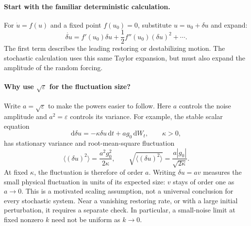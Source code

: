 \documentclass{article}
\begin{document}
\paragraph{Start with the familiar deterministic calculation.}
For $\dot u=f(u)$ and a fixed point $f(u_0)=0$, substitute $u=u_0+\delta u$ and expand:
\begin{equation}
    \dot{\delta u}=f'(u_0)\delta u+\frac12f''(u_0)(\delta u)^2+\cdots.
\end{equation}
The first term describes the leading restoring or destabilizing motion. The stochastic calculation uses this same Taylor expansion, but must also expand the amplitude of the random forcing.

\paragraph{Why use $\sqrt{\varepsilon}$ for the fluctuation size?}
Write $a=\sqrt{\varepsilon}$ to make the powers easier to follow. Here $a$ controls the noise amplitude and $a^2=\varepsilon$ controls its variance. For example, the stable scalar equation
\begin{equation}
    \mathrm d\delta u=-\kappa\delta u\,\mathrm dt+a g_0\,\mathrm dW_t,
    \qquad \kappa>0,
\end{equation}
has stationary variance and root-mean-square fluctuation
\begin{equation}
    \langle(\delta u)^2\rangle=\frac{a^2g_0^2}{2\kappa},\qquad
    \sqrt{\langle(\delta u)^2\rangle}=\frac{a|g_0|}{\sqrt{2\kappa}}.
\end{equation}
At fixed $\kappa$, the fluctuation is therefore of order $a$. Writing $\delta u=a v$ measures the small physical fluctuation in units of its expected size: $v$ stays of order one as $a\to0$. This is a motivated scaling assumption, not a universal conclusion for every stochastic system. Near a vanishing restoring rate, or with a large initial perturbation, it requires a separate check. In particular, a small-noise limit at fixed nonzero $k$ need not be uniform as $k\to0$.
\end{document}
